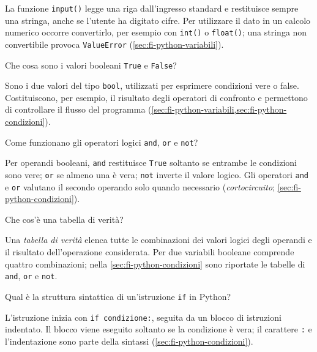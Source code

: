 La funzione \texttt{input()} legge una riga dall'ingresso standard e
restituisce sempre una stringa, anche se l'utente ha digitato cifre.
Per utilizzare il dato in un calcolo numerico occorre convertirlo,
per esempio con \texttt{int()} o \texttt{float()}; una stringa non
convertibile provoca \texttt{ValueError}
(\cref{sec:fi-python-variabili}).

\begin{exercise}
\label{ex:fi-python-booleani}
Che cosa sono i valori booleani \texttt{True} e \texttt{False}?
\end{exercise}

Sono i due valori del tipo \texttt{bool}, utilizzati per esprimere
condizioni vere o false. Costituiscono, per esempio, il risultato
degli operatori di confronto e permettono di controllare il flusso
del programma (\cref{sec:fi-python-variabili,sec:fi-python-condizioni}).

\begin{exercise}
\label{ex:fi-python-operatori-logici}
Come funzionano gli operatori logici \texttt{and}, \texttt{or} e
\texttt{not}?
\end{exercise}

Per operandi booleani, \texttt{and} restituisce \texttt{True} soltanto
se entrambe le condizioni sono vere; \texttt{or} se almeno una è vera;
\texttt{not} inverte il valore logico. Gli operatori \texttt{and} e
\texttt{or} valutano il secondo operando solo quando necessario
(\emph{cortocircuito}; \cref{sec:fi-python-condizioni}).

\begin{exercise}
\label{ex:fi-python-tabella-verita}
Che cos'è una tabella di verità?
\end{exercise}

Una \emph{tabella di verità} elenca tutte le combinazioni dei valori
logici degli operandi e il risultato dell'operazione considerata.
Per due variabili booleane comprende quattro combinazioni; nella
\cref{sec:fi-python-condizioni} sono riportate le tabelle di
\texttt{and}, \texttt{or} e \texttt{not}.

\clearpage

\begin{exercise}
\label{ex:fi-python-sintassi-if}
Qual è la struttura sintattica di un'istruzione \texttt{if} in Python?
\end{exercise}

L'istruzione inizia con \lstinline|if condizione:|, seguita da
un blocco di istruzioni indentato. Il blocco viene eseguito soltanto
se la condizione è vera; il carattere \texttt{:} e l'indentazione
sono parte della sintassi (\cref{sec:fi-python-condizioni}).

